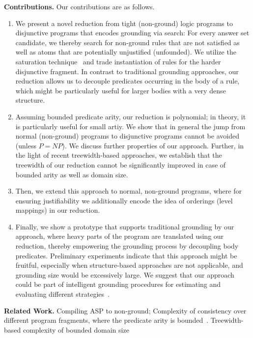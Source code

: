 \documentclass{article}
\begin{document}
\medskip%
\noindent\textbf{Contributions. }Our contributions are as follows.
\begin{enumerate}
	\item We present a novel reduction from tight (non-ground) logic programs to disjunctive programs that encodes grounding via
search: For every answer set candidate, we thereby search for non-ground rules that are not satisfied as well as atoms that are potentially unjustified (unfounded). We utilize the saturation technique~\cite{} and trade instantiation of rules for the harder disjunctive fragment. In contrast to traditional grounding approaches, our reduction allows us to decouple predicates occurring in the body of a rule, which might be particularly useful for larger bodies with a very dense structure.
	\item Assuming bounded predicate arity, our reduction is polynomial; in theory, it is particularly useful for small artiy. We show
that in general the jump from normal (non-ground) programs to disjunctive programs cannot be avoided (unless $P=NP$). 
We discuss further properties of our approach. %
	Further, in the light of recent treewidth-based approaches, 
            we establish that the treewidth of our reduction cannot be significantly improved in case of bounded arity as well as domain size. %
	\item Then, we extend this approach to normal, non-ground programs, where for ensuring justifiability we additionally 
encode the idea of orderings (level mappings) in our reduction. 
	\item Finally, we show a prototype that supports traditional grounding by our approach, where heavy parts of the program are translated using our reduction, thereby empowering the grounding process by decoupling body predicates. %
Preliminary experiments indicate that this approach might be fruitful, especially when structure-based approaches are not applicable, 
and grounding size would be excessively large. We suggest that our approach could be part of intelligent grounding procedures for estimating and evaluating different strategies~\cite{}. %
\end{enumerate}

\smallskip
\noindent\textbf{Related Work. }Compiling ASP to non-ground;
Complexity of consistency over different program fragments,
where the predicate arity is bounded~\cite{EiterFaberFink07}.
Treewidth-based complexity of bounded domain size~\cite{FichteHecherMeier21}

\clearpage


\end{document}
